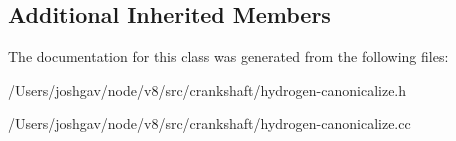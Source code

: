 \subsection*{Additional Inherited Members}


The documentation for this class was generated from the following files\+:\begin{DoxyCompactItemize}
\item 
/\+Users/joshgav/node/v8/src/crankshaft/hydrogen-\/canonicalize.\+h\item 
/\+Users/joshgav/node/v8/src/crankshaft/hydrogen-\/canonicalize.\+cc\end{DoxyCompactItemize}

